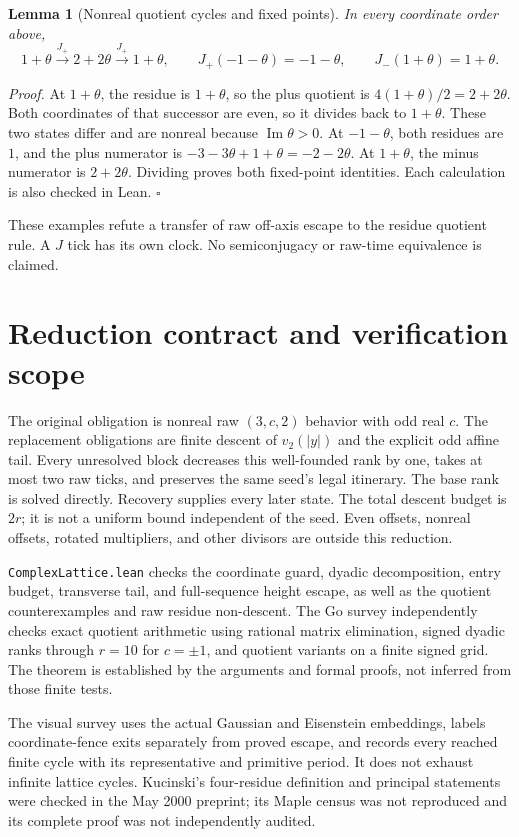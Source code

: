 \documentclass[11pt,letterpaper]{article}
\newtheorem{lemma}[theorem]{Lemma}
\newenvironment{proof}{\noindent\textit{Proof.}}{\hfill\(\square\)}
\begin{document}
\begin{lemma}[Nonreal quotient cycles and fixed points]
In every coordinate order above,
\[
1+\theta\xrightarrow{J_+}2+2\theta\xrightarrow{J_+}1+\theta,
\qquad J_+(-1-\theta)=-1-\theta,
\qquad J_-(1+\theta)=1+\theta.
\]
\end{lemma}
\begin{proof}
At \(1+\theta\), the residue is \(1+\theta\), so the plus quotient is \(4(1+\theta)/2=2+2\theta\). Both coordinates of that successor are even, so it divides back to \(1+\theta\). These two states differ and are nonreal because \(\operatorname{Im}\theta>0\). At \(-1-\theta\), both residues are \(1\), and the plus numerator is \(-3-3\theta+1+\theta=-2-2\theta\). At \(1+\theta\), the minus numerator is \(2+2\theta\). Dividing proves both fixed-point identities. Each calculation is also checked in Lean.
\end{proof}

These examples refute a transfer of raw off-axis escape to the residue quotient rule. A \(J\) tick has its own clock. No semiconjugacy or raw-time equivalence is claimed.

\section{Reduction contract and verification scope}

The original obligation is nonreal raw \((3,c,2)\) behavior with odd real \(c\). The replacement obligations are finite descent of \(v_2(|y|)\) and the explicit odd affine tail. Every unresolved block decreases this well-founded rank by one, takes at most two raw ticks, and preserves the same seed's legal itinerary. The base rank is solved directly. Recovery supplies every later state. The total descent budget is \(2r\); it is not a uniform bound independent of the seed. Even offsets, nonreal offsets, rotated multipliers, and other divisors are outside this reduction.

\texttt{ComplexLattice.lean} checks the coordinate guard, dyadic decomposition, entry budget, transverse tail, and full-sequence height escape, as well as the quotient counterexamples and raw residue non-descent. The Go survey independently checks exact quotient arithmetic using rational matrix elimination, signed dyadic ranks through \(r=10\) for \(c=\pm1\), and quotient variants on a finite signed grid. The theorem is established by the arguments and formal proofs, not inferred from those finite tests.

The visual survey uses the actual Gaussian and Eisenstein embeddings, labels coordinate-fence exits separately from proved escape, and records every reached finite cycle with its representative and primitive period. It does not exhaust infinite lattice cycles. Kucinski's four-residue definition and principal statements were checked in the May 2000 preprint; its Maple census was not reproduced and its complete proof was not independently audited.



\end{document}
